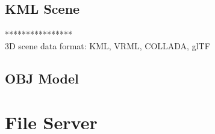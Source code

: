 \subsection{KML Scene}

****************\\
3D scene data format: KML, VRML, COLLADA,  glTF\\

\subsection{OBJ Model}

\section{File Server}

